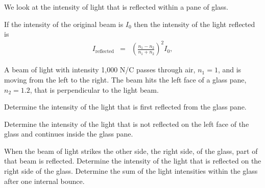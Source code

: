 \begin{problem}
  \item We look at the intensity of light that is reflected within a pane of glass.


  If the intensity of the original beam is $I_0$ then the intensity of the light reflected is
  \begin{eqnarray*}
    I_{\mathrm{reflected}} & = & \left(\frac{n_1-n_2}{n_1+n_2}\right)^2 I_0,
  \end{eqnarray*}

  A beam of light with intensity 1,000 N/C passes through air, $n_1=1$, and is moving from the left to the right.
  The beam hits the left face of a glass pane, $n_2=1.2$, that is perpendicular to the light beam.

  \begin{subproblem}
    \item  Determine the intensity of the light that is first reflected from the glass pane.
    \vfill

    \item Determine the intensity of the light that is not reflected on the left face of the glass and continues inside the glass pane.
      \vfill

      \clearpage

    \item When the beam of light strikes the other side, the right side, of the glass, part of that beam is reflected.
    Determine the intensity of the light that is reflected on the right side of the glass.
    Determine the sum of the light intensities within the glass after one internal bounce.
      \vfill


\end{subproblem}
\end{problem}
